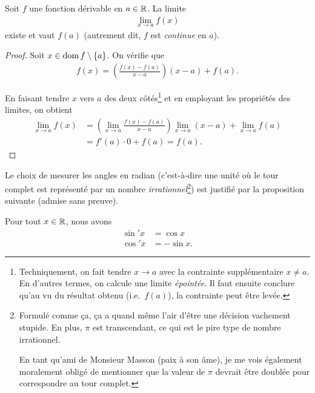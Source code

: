 \documentclass[main.tex]{subfiles}
\begin{document}
\begin{proposition}

    Soit $f$ une fonction dérivable en $a \in \mathbb{R}$.
    La limite
    \begin{align}
        \lim_{x \to a} f(x)
    \end{align}
    existe et vaut $f(a)$
    (autrement dit, $f$ est \emph{continue} en $a$).
\end{proposition}
\begin{proof}
    Soit $x \in \operatorname{dom} f \setminus \{a\}$.
    On vérifie que
    \begin{align}
        f(x) = \left(\frac {f(x) - f(a)} {x - a}\right) (x - a) + f(a).
    \end{align}

    En faisant tendre $x$ vers $a$ des deux côtés\footnote{%
        Techniquement, on fait tendre $x \to a$ avec la contrainte supplémentaire $x \neq a$.
        En d'autres termes, on calcule une limite \emph{épointée}.
        Il faut ensuite conclure qu'au vu du résultat obtenu (i.e.\ $f(a)$),
        la contrainte peut être levée.
    }
    et en employant les propriétés des limites,
    on obtient
    \begin{align}
        \lim_{x \to a} f(x)
        &= \left(\lim_{x \to a} \frac {f(x) - f(a)} {x - a}\right) \lim_{x \to a} (x - a) + \lim_{x \to a} f(a)\\
        &= f'(a) \cdot 0 + f(a) = f(a).
    \end{align}
\end{proof}

Le choix de mesurer les angles en radian
(c'est-à-dire une unité où le tour complet est représenté par un nombre \emph{irrationnel}\footnote{%
    Formulé comme ça, ça a quand même l'air d'être une décision vachement stupide.
    En plus, $\pi$ est transcendant, ce qui est le pire type de nombre irrationnel.

    En tant qu'ami de Monsieur Masson (paix à son âme),
    je me vois également moralement obligé de mentionner
    que la valeur de $\pi$ devrait être doublée pour correspondre au tour complet.
})
est justifié par la proposition suivante (admise sans preuve).

\begin{proposition}

    Pour tout $x \in \mathbb{R}$,
    nous avons
    \begin{align}
        \sin' x &= \cos x\\
        \cos' x &= -\sin x.
    \end{align}
\end{proposition}
\end{document}
